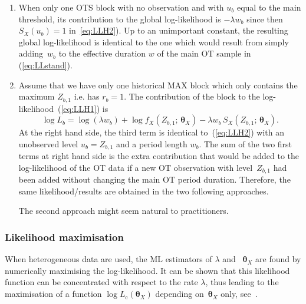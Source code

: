 \documentclass[a4paper]{report}
\newcommand{\bs}{\boldsymbol}
\begin{document}
\begin{enumerate}
\item When only one OTS block with no observation and with
  $u_{b}$ equal to the main threshold, its contribution to the global
  log-likelihood is $-\lambda w_{b}$ since then $S_X(u_{b})=1$
  in~\ref{eq:LLH2}).  Up to an unimportant constant, the resulting
  global log-likelihood is identical to the one which would result from
  simply adding~$w_{b}$ to the effective duration $w$ of the main OT sample
  in (\ref{eq:LLstand}).
  
\item Assume that we have only one historical MAX block which only
  contains the maximum $Z_{b,1}$ i.e. has $r_b=1$.  The contribution
  of the block to the log-likelihood~(\ref{eq:LLH1}) is
  $$
  \log L_b = \log(\lambda w_{b}) + \log f_X(Z_{b,1};\,\bs{\theta}_X)
  -\lambda w_{b} \, S_X(Z_{b,1};\,\bs{\theta}_X).
  $$
  At the right hand side, the third term is identical to~(\ref{eq:LLH2})
  with an unobserved level $u_{b}=Z_{b,1}$ and a period length
  $w_{b}$. The sum of the two first terms at right hand side is the extra
  contribution that would be added to the log-likelihood of the OT data
  if a new OT observation with level~$Z_{b,1}$ had been added without
  changing the main OT period duration. Therefore, the same
  likelihood/results are obtained in the two following approaches.
  The second approach might seem natural to practitioners.
  
\end{enumerate}

\subsubsection*{Likelihood maximisation}
When heterogeneous data are used, the ML estimators of $\lambda$ and
~$\bs{\theta}_X$ are found by numerically maximising the log-likelihood.
It can be shown that this likelihood function can be concentrated with
respect to the rate $\lambda$, thus 
leading to the maximisation of a function $\log
L_{\textrm{c}}(\bs{\theta}_X)$ depending on~$\bs{\theta}_X$ only,
see~\citet{RenCompDet}. 
\end{document}
